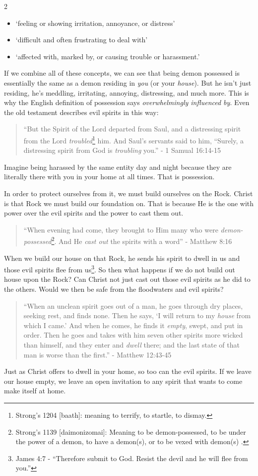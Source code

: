 \documentclass[10pt]{article}
\begin{document}
\begin{multicols}{2}
\begin{itemize}
	\setlength\itemsep{0em}
	\item `feeling or showing irritation, annoyance, or distress'
	\item `difficult and often frustrating to deal with'
	\item  `affected with, marked by, or causing trouble or harassment.'
\end{itemize}
If we combine all of these concepts, we can see that being demon possessed is essentially the same as a demon residing in \textit{you} (or your \textit{house}). But he isn't just residing, he's meddling, irritating, annoying, distressing, and much more. This is why the English definition of possession says \textit{overwhelmingly influenced by}. Even the old testament describes evil spirits in this way:
\begin{quotation}
``But the Spirit of the Lord departed from Saul, and a distressing spirit from the Lord \textit{troubled}\footnote{Strong's 1204 [baath]: meaning to terrify, to startle, to dismay.} him. And Saul’s servants said to him, “Surely, a distressing spirit from God is \textit{troubling} you.'' - 1 Samual 16:14-15
\end{quotation}
Imagine being harassed by the same entity day and night because they are literally there with you in your home at all times. That is possession.

In order to protect ourselves from it, we must build ourselves on the Rock. Christ is that Rock we must build our foundation on. That is because He is the one with power over the evil spirits and the power to cast them out. 
\begin{quotation}
``When evening had come, they brought to Him many who were \textit{demon-possessed}\footnote{Strong's 1139 [daimonizomai]: Meaning to be demon-possessed, to be under the power of a demon, to have a demon(s), or to be vexed with demon(s) \cite{Bible Hub}.}. And He \textit{cast out} the spirits with a word'' - Matthew 8:16
\end{quotation}
When we build our house on that Rock, he sends his spirit to dwell in us and those evil spirits flee from us\footnote{James 4:7 - ``Therefore submit to God. Resist the devil and he will flee from you.''}. So then what happens if we do not build out house upon the Rock? Can Christ not just cast out those evil spirits as he did to the others. Would we then be safe from the floodwaters and evil spirits?
\begin{quotation}
``When an unclean spirit goes out of a man, he goes through dry places, seeking rest, and finds none. Then he says, ‘I will return to my \textit{house} from which I came.’ And when he comes, he finds it \textit{empty}, swept, and put in order.  Then he goes and takes with him seven other spirits more wicked than himself, and they enter and \textit{dwell} there; and the last state of that man is worse than the first.'' - Matthew 12:43-45
\end{quotation}
Just as Christ offers to dwell in your home, so too can the evil spirits. If we leave our house empty, we leave an open invitation to any spirit that wants to come make itself at home. 


\end{multicols}
\end{document}
